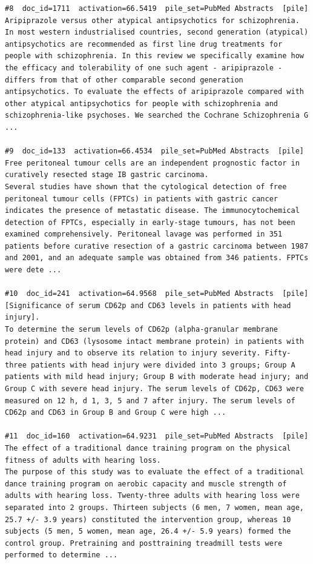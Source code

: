 \begin{verbatim}
#8  doc_id=1711  activation=66.5419  pile_set=PubMed Abstracts  [pile]
Aripiprazole versus other atypical antipsychotics for schizophrenia.
In most western industrialised countries, second generation (atypical) antipsychotics are recommended as first line drug treatments for people with schizophrenia. In this review we specifically examine how the efficacy and tolerability of one such agent - aripiprazole - differs from that of other comparable second generation antipsychotics. To evaluate the effects of aripiprazole compared with other atypical antipsychotics for people with schizophrenia and schizophrenia-like psychoses. We searched the Cochrane Schizophrenia G ...

#9  doc_id=133  activation=66.4534  pile_set=PubMed Abstracts  [pile]
Free peritoneal tumour cells are an independent prognostic factor in curatively resected stage IB gastric carcinoma.
Several studies have shown that the cytological detection of free peritoneal tumour cells (FPTCs) in patients with gastric cancer indicates the presence of metastatic disease. The immunocytochemical detection of FPTCs, especially in early-stage tumours, has not been examined comprehensively. Peritoneal lavage was performed in 351 patients before curative resection of a gastric carcinoma between 1987 and 2001, and an adequate sample was obtained from 346 patients. FPTCs were dete ...

#10  doc_id=241  activation=64.9568  pile_set=PubMed Abstracts  [pile]
[Significance of serum CD62p and CD63 levels in patients with head injury].
To determine the serum levels of CD62p (alpha-granular membrane protein) and CD63 (lysosome intact membrane protein) in patients with head injury and to observe its relation to injury severity. Fifty-three patients with head injury were divided into 3 groups; Group A patients with mild head injury; Group B with moderate head injury; and Group C with severe head injury. The serum levels of CD62p, CD63 were measured on 12 h, d 1, 3, 5 and 7 after injury. The serum levels of CD62p and CD63 in Group B and Group C were high ...

#11  doc_id=160  activation=64.9231  pile_set=PubMed Abstracts  [pile]
The effect of a traditional dance training program on the physical fitness of adults with hearing loss.
The purpose of this study was to evaluate the effect of a traditional dance training program on aerobic capacity and muscle strength of adults with hearing loss. Twenty-three adults with hearing loss were separated into 2 groups. Thirteen subjects (6 men, 7 women, mean age, 25.7 +/- 3.9 years) constituted the intervention group, whereas 10 subjects (5 men, 5 women, mean age, 26.4 +/- 5.9 years) formed the control group. Pretraining and posttraining treadmill tests were performed to determine ...


\end{verbatim}

